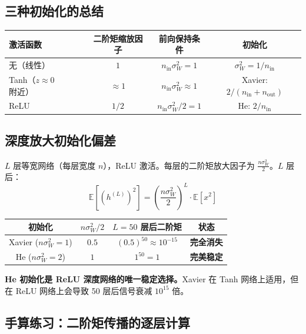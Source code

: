 \documentclass[12pt, a4paper]{ctexart}
\begin{document}
\subsection{三种初始化的总结}

\begin{center}
\begin{tabular}{l|ccc}
激活函数 & 二阶矩缩放因子 & 前向保持条件 & 初始化 \\
\hline
无（线性）& $1$ & $n_{\text{in}} \sigma_W^2 = 1$ & $\sigma_W^2 = 1/n_{\text{in}}$ \\
Tanh（$z \approx 0$ 附近）& $\approx 1$ & $n_{\text{in}} \sigma_W^2 \approx 1$ & Xavier: $2/(n_{\text{in}}+n_{\text{out}})$ \\
ReLU & $1/2$ & $n_{\text{in}} \sigma_W^2 / 2 = 1$ & He: $2/n_{\text{in}}$ \\
\end{tabular}
\end{center}

\subsection{深度放大初始化偏差}

$L$ 层等宽网络（每层宽度 $n$），ReLU 激活。每层的二阶矩放大因子为 $\frac{n\sigma_W^2}{2}$。$L$ 层后：
\begin{equation}
    \mathbb{E}[(h^{(L)})^2] = \left(\frac{n \sigma_W^2}{2}\right)^L \cdot \mathbb{E}[x^2]
\end{equation}

\begin{center}
\begin{tabular}{c|ccc}
初始化 & $n\sigma_W^2/2$ & $L = 50$ 层后二阶矩 & 状态 \\
\hline
Xavier ($n\sigma_W^2 = 1$) & $0.5$ & $(0.5)^{50} \approx 10^{-15}$ & \textbf{完全消失} \\
He ($n\sigma_W^2 = 2$) & $1$ & $1^{50} = 1$ & \textbf{完美稳定} \\
\end{tabular}
\end{center}

\textbf{He 初始化是 ReLU 深度网络的唯一稳定选择。}Xavier 在 Tanh 网络上适用，但在 ReLU 网络上会导致 50 层后信号衰减 $10^{15}$ 倍。

\subsection{手算练习：二阶矩传播的逐层计算}
\end{document}
